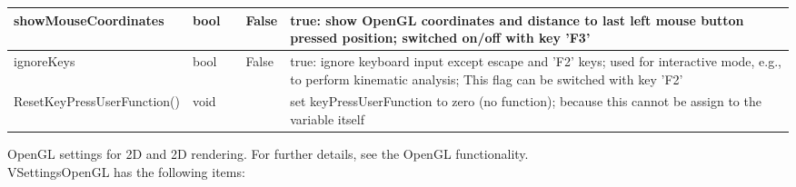 \begin{center}
\begin{longtable}{| p{4.2cm} | p{2.5cm} | p{0.3cm} | p{3.0cm} | p{6cm} |}
    showMouseCoordinates &     bool &      &     False &     true: show OpenGL coordinates and distance to last left mouse button pressed position; switched on/off with key 'F3'\\ \hline
    ignoreKeys &     bool &      &     False &     true: ignore keyboard input except escape and 'F2' keys; used for interactive mode, e.g., to perform kinematic analysis; This flag can be switched with key 'F2'\\ \hline
    ResetKeyPressUserFunction() &     void &      &      &     set keyPressUserFunction to zero (no function); because this cannot be assign to the variable itself\\ \hline
	  \end{longtable}
	\end{center}

 \label{sec:VSettingsOpenGL}
OpenGL settings for 2D and 2D rendering. For further details, see the OpenGL functionality. \\ 
%
VSettingsOpenGL has the following items:
